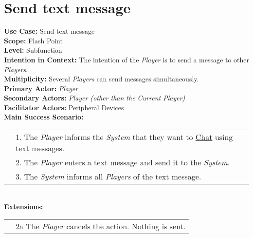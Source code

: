 \documentclass{article}
\begin{document}
	\section*{Send text message}
	\textbf{Use Case:} Send text message\\
	\textbf{Scope:} Flash Point\\
	\textbf{Level:} Subfunction\\
	\textbf{Intention in Context: } The intention of the \textit{Player} is to send a message to other \textit{Players}.\\
	\textbf{Multiplicity: } Several \textit{Players} can send messages simultaneously.\\
	\textbf{Primary Actor:} \textit{Player}\\
	\textbf{Secondary Actors:} \textit{Player (other than the Current Player)}\\
	\textbf{Facilitator Actors:} Peripheral Devices\\
	\textbf{Main Success Scenario:}\\
	\begin{tabular}{l l}
		&1. The \textit{Player} informs the \textit{System} that they want to \underline{Chat} using text messages.\\
		&2. The \textit{Player} enters a text message and send it to the \textit{System}.\\
		&3. The \textit{System} informs all \textit{Players} of the text message.\\
	\end{tabular}\\
	\textbf{Extensions: }\\
	\begin{tabular}{l l}
		&2a The \textit{Player} cancels the action. Nothing is sent.
	\end{tabular}
\end{document}
